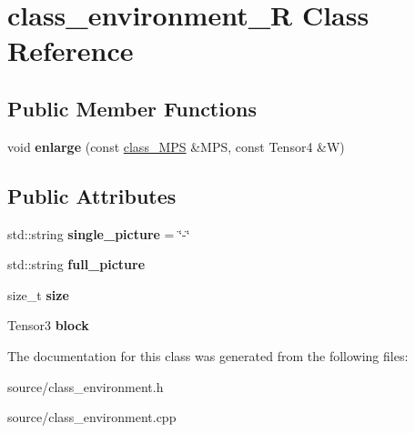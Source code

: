 \hypertarget{classclass__environment___r}{}\section{class\+\_\+environment\+\_\+R Class Reference}
\label{classclass__environment___r}
\subsection*{Public Member Functions}
\begin{DoxyCompactItemize}
\item 
void {\bfseries enlarge} (const \hyperlink{classclass___m_p_s}{class\+\_\+\+M\+PS} \&M\+PS, const Tensor4 \&W)\hypertarget{classclass__environment___r_a7df690c150d93ed56d4ea61558937a29}{}\label{classclass__environment___r_a7df690c150d93ed56d4ea61558937a29}

\end{DoxyCompactItemize}
\subsection*{Public Attributes}
\begin{DoxyCompactItemize}
\item 
std\+::string {\bfseries single\+\_\+picture} = \char`\"{}-\/\char`\"{}\hypertarget{classclass__environment___r_a92410fb5b1d4fe0cad21a4099c6694af}{}\label{classclass__environment___r_a92410fb5b1d4fe0cad21a4099c6694af}

\item 
std\+::string {\bfseries full\+\_\+picture}\hypertarget{classclass__environment___r_ae885c9da50da9f70f44ff6e12d43d51c}{}\label{classclass__environment___r_ae885c9da50da9f70f44ff6e12d43d51c}

\item 
size\+\_\+t {\bfseries size}\hypertarget{classclass__environment___r_a305167d98081e9cfb6d6345b63fdf3de}{}\label{classclass__environment___r_a305167d98081e9cfb6d6345b63fdf3de}

\item 
Tensor3 {\bfseries block}\hypertarget{classclass__environment___r_a9cdf8690a03d99e12cb2c80cff751ef4}{}\label{classclass__environment___r_a9cdf8690a03d99e12cb2c80cff751ef4}

\end{DoxyCompactItemize}


The documentation for this class was generated from the following files\+:\begin{DoxyCompactItemize}
\item 
source/class\+\_\+environment.\+h\item 
source/class\+\_\+environment.\+cpp\end{DoxyCompactItemize}
